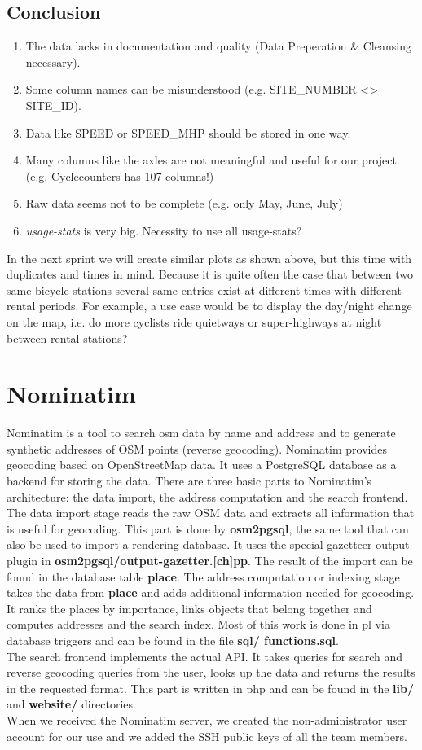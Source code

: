 \documentclass[12pt]{article}
\begin{document}
\subsection{Conclusion}
\begin{enumerate}
\item The data lacks in documentation and quality (Data Preperation \& Cleansing necessary).
\item Some column names can be misunderstood (e.g. SITE\_NUMBER <> SITE\_ID).
\item Data like SPEED or SPEED\_MHP should be stored in one way.
\item Many columns like the axles are not meaningful and useful for our project. (e.g. Cyclecounters
has 107 columns!)
\item Raw data seems not to be complete (e.g. only May, June, July)
\item \emph{usage-stats} is very big. Necessity to use all usage-stats?
\end{enumerate}
In the next sprint we will create similar plots as shown above, but this time with duplicates and times in mind. Because it is quite often the case that between two same bicycle stations several same entries exist at different times with different rental periods. For example, a use case would be to display the day/night change on the map,
i.e. do more cyclists ride quietways or super-highways at night between rental stations?
\section{Nominatim}
Nominatim is a tool to search \ac{osm} data by name and address and to generate
synthetic addresses of OSM points (reverse geocoding).
Nominatim provides geocoding based on OpenStreetMap data. It uses a PostgreSQL
database as a backend for storing the data.
There are three basic parts to Nominatim's architecture: the data import, the address
computation and the search frontend.
The data import stage reads the raw OSM data and extracts all information that is useful
for geocoding. This part is done by \textbf{osm2pgsql}, the same tool that can also be used to
import a rendering database. It uses the special gazetteer output plugin in \textbf{osm2pgsql/output-gazetter.[ch]pp}. The result of the import can be found in the database table \textbf{place}.
The address computation or indexing stage takes the data from \textbf{place} and adds
additional information needed for geocoding. It ranks the places by importance, links
objects that belong together and computes addresses and the search index. Most of
this work is done in \ac{pl} via database triggers and can be found in the file \textbf{sql/
functions.sql}.\\
The search frontend implements the actual API. It takes queries for search and reverse
geocoding queries from the user, looks up the data and returns the results in the requested
format. This part is written in php and can be found in the \textbf{lib/} and \textbf{website/} directories.\\
When we received the Nominatim server, we created the non-administrator user account for our use and we added the SSH public keys of all the team members.
\end{document}
